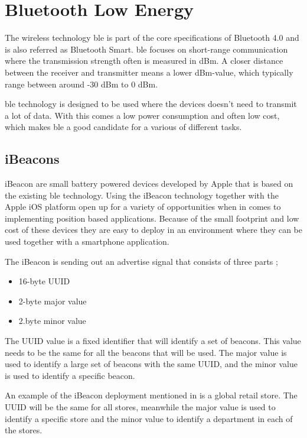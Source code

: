 \section{Bluetooth Low Energy}\label{sec:theoryBle}
The wireless technology \acrfull{ble} is part of the core specifications of Bluetooth 4.0 and is also referred as Bluetooth Smart.
\acrshort{ble} focuses on short-range communication where the transmission strength often is measured in dBm.
A closer distance between the receiver and transmitter means a lower dBm-value, which typically range between around -30 dBm to 0 dBm.
\cite{DevelopmentMobileIndoor2017} 

\bigskip

\acrshort{ble} technology is designed to be used where the devices doesn't need to transmit a lot of data.
With this comes a low power consumption and often low cost, which makes \acrshort{ble} a good candidate for a various of different tasks.
\cite{PracticalFingerprintingLocalization2017} 


\subsection{iBeacons}\label{sec:theoryBleiBeacons}
iBeacon are small battery powered devices developed by Apple that is based on the existing \acrshort{ble} technology.
Using the iBeacon technology together with the Apple iOS platform open up for a variety of opportunities when in comes to implementing position based applications.
Because of the small footprint and low cost of these devices they are easy to deploy in an environment where they can be used together with a smartphone application.
\cite{BluetoothLowEnergy2018} 

\bigskip

The iBeacon is sending out an advertise signal that consists of three parts \cite{GettingStartedIBeacon2014};
\begin{itemize}
\item 16-byte UUID
\item 2-byte major value
\item 2.byte minor value
\end{itemize}

The UUID value is a fixed identifier that will identify a set of beacons.
This value needs to be the same for all the beacons that will be used.
The major value is used to identify a large set of beacons with the same UUID, and the minor value is used to identify a specific beacon.
\cite{GettingStartedIBeacon2014}

\bigskip

An example of the iBeacon deployment mentioned in \cite{GettingStartedIBeacon2014} is a global retail store. The UUID will be the same for all stores, meanwhile the major value is used to identify a specific store and the minor value to identify a department in each of the stores.
\cite{GettingStartedIBeacon2014} 

